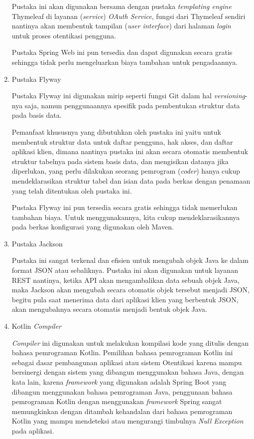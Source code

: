 \documentclass[pdftex,12pt, oneside]{article}
\begin{document}
\begin{enumerate}
	Pustaka ini akan digunakan bersama dengan pustaka \textit{templating engine} Thymeleaf di layanan (\textit{service}) \textit{OAuth Service}, fungsi dari Thymeleaf sendiri nantinya akan membentuk tampilan (\textit{user interface}) dari halaman \textit{login} untuk proses otentikasi pengguna.
	
	Pustaka Spring Web ini pun tersedia dan dapat digunakan secara gratis sehingga tidak perlu mengeluarkan biaya tambahan untuk pengadaannya.
	
	\item Pustaka Flyway
	
	Pustaka Flyway ini digunakan mirip seperti fungsi Git dalam hal \textit{versioning}-nya saja, namun penggunaannya spesifik pada pembentukan struktur data pada basis data.
	
	Pemanfaat khususnya yang dibutuhkan oleh pustaka ini yaitu untuk membentuk struktur data untuk daftar pengguna, hak akses, dan daftar aplikasi klien, dimana nantinya pustaka ini akan secara otomatis membentuk struktur tabelnya pada sistem basis data, dan mengisikan datanya jika diperlukan, yang perlu dilakukan seorang pemrogram (\textit{coder}) hanya cukup mendeklarasikan struktur tabel dan isian data pada berkas dengan penamaan yang telah ditentukan oleh pustaka ini.
	
	Pustaka Flyway ini pun tersedia secara gratis sehingga tidak memerlukan tambahan biaya. Untuk menggunakannya, kita cukup mendeklarasikannya pada berkas konfigurasi yang digunakan oleh Maven.

	\item Pustaka Jackson

Pustaka ini sangat terkenal dan efisien untuk mengubah objek Java ke dalam format JSON atau sebaliknya.	Pustaka ini akan digunakan untuk layanan REST nantinya, ketika API akan mengambalikan data sebuah objek Java, maka Jackson akan mengubah secara otomatis objek tersebut menjadi JSON, begitu pula saat menerima data dari aplikasi klien yang berbentuk JSON, akan mengubahnya secara otomatis menjadi bentuk objek Java.

	\item Kotlin \textit{Compiler}

\textit{Compiler} ini digunakan untuk melakukan kompilasi kode yang ditulis dengan bahasa pemrograman Kotlin. Pemilihan bahasa pemrograman Kotlin ini sebagai dasar pembangunan aplikasi atau sistem Otentikasi karena mampu bersinergi dengan sistem yang dibangun menggunakan bahasa Java, dengan kata lain, karena \textit{framework} yang digunakan adalah Spring Boot yang dibangun menggunakan bahasa pemrograman Java, penggunaan bahasa pemrograman Kotlin dengan menggunakan \textit{framework} Spring sangat memungkinkan dengan ditambah kehandalan dari bahasa pemrograman Kotlin yang mampu mendeteksi atau mengurangi timbulnya \textit{Null Exception} pada aplikasi.


\end{enumerate}
\end{document}

